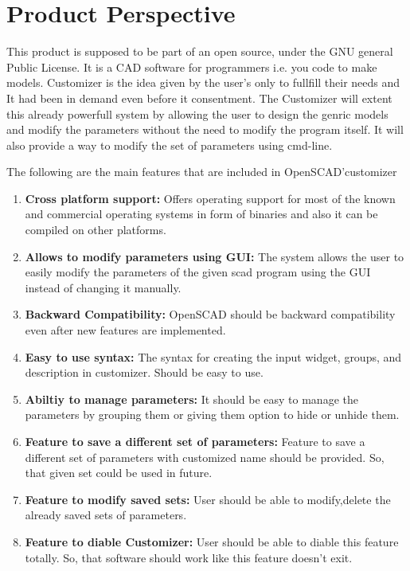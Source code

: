 \section{Product Perspective}
   
This product is supposed to be part of an open source, under the GNU general Public License. It is a CAD software for programmers i.e. you code to make models. Customizer is the idea given by the user's only to fullfill their needs and It had been in demand even before it consentment. The Customizer will extent this already powerfull system by allowing the user to design the genric models and modify the parameters without the need to modify the program itself. It will also provide a way to modify the set of parameters using cmd-line.
   
The following are the main features that are included in OpenSCAD'customizer

\begin{enumerate}
    \item \textbf{Cross platform support:} Offers operating support for most of the known and commercial operating systems in form of binaries and also it can be compiled on other platforms.
   
    \item \textbf{Allows to modify parameters using GUI:} The system allows the user to easily modify the parameters of the given scad program using the GUI instead of changing it
    manually.
   
    \item \textbf{Backward Compatibility:} OpenSCAD should be backward compatibility even after new features are implemented.
   
    \item \textbf{Easy to use syntax:} The syntax for creating the input widget, groups, and description in customizer. Should be easy to use.
   
    \item \textbf{Abiltiy to manage parameters:} It should be easy to manage the parameters by grouping them or giving them option to hide or unhide them.
   
    \item \textbf{Feature to save a different set of parameters:} Feature to save a different set of parameters with customized name should be provided. So, that given set could be used in future.
   
    \item \textbf{Feature to modify saved sets:} User should be able to modify,delete the already saved sets of parameters.
    
    \item \textbf{Feature to diable Customizer:} User should be able to diable this feature totally. So, that software should work like this feature doesn't exit.
   
\end{enumerate}  
